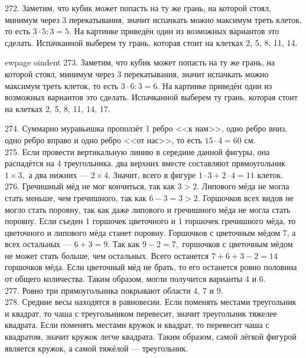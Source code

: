 272. Заметим, что кубик может попасть на ту же грань, на которой стоял, минимум через 3 перекатывания, значит испачкать можно максимум треть клеток, то есть $3\cdot5:3=5.$ На картинке приведён один из возможных вариантов это сделать. Испачканной выберем ту грань, которая стоит на клетках 2, 5, 8, 11, 14.
\begin{center}
\begin{figure}[ht!]
\end{figure}
\end{center}

ewpage
oindent
273. Заметим, что кубик может попасть на ту же грань, на которой стоял, минимум через 3 перекатывания, значит испачкать можно максимум треть клеток, то есть $3\cdot6:3=6.$ На картинке приведён один из возможных вариантов это сделать. Испачканной выберем ту грань, которая стоит на клетках 2, 5, 8, 11, 14, 17.
\begin{center}
\begin{figure}[ht!]
\end{figure}
\end{center}
274. Суммарно муравьишка проползёт 1 ребро <<к нам>>, одно ребро вниз, одно ребро вправо и одно ребро <<от нас>>, то есть $15\cdot4=60$ см.\\
275. Если провести вертикальную линию в середине данной фигуры, она распадётся на 4 треугольника. два верхних вместе составляют прямоугольник $1\times3,$ а два нижних --- $2\times4.$ Значит, всего в фигуре $1\cdot3+2\cdot4=11$ клеток.\\
276. Гречишный мёд не мог кончиться, так как $3>2.$ Липового мёда не могла стать меньше, чем гречишного, так как $6-3=3>2.$ Горшочков всех видов не могло стать поровну, так как даже липового и гречишного мёда не могла стать поровну. Если съеден 1 горшочек цветочного и 1 горшочек гречишного мёда, то цветочного и липового мёда станет поровну. Горшочков с цветочным мёдом 7, а всех остальных --- $6+3=9.$ Так как $9-2=7,$ горшочков с цветочным мёдом не может стать больше, чем остальных. Всего останется $7+6+3-2=14$ горшочков мёда. Если цветочный мёд не брать, то его останется ровно половина от общего количества. Таким образом, могли получится варианты 4 и 6.\\
277. Ровно три прямоугольника покрывают области 4, 7 и 9.\\
278. Средние весы находятся в равновесии. Если поменять местами треугольник и квадрат, то чаша с треугольником перевесит, значит треугольник тяжелее квадрата. Если поменять местами кружок и квадрат, то перевесит чаша с квадратом, значит кружок легче квадрата. Таким образом, самой лёгкой фигурой является кружок, а самой тяжёлой --- треугольник.\\
